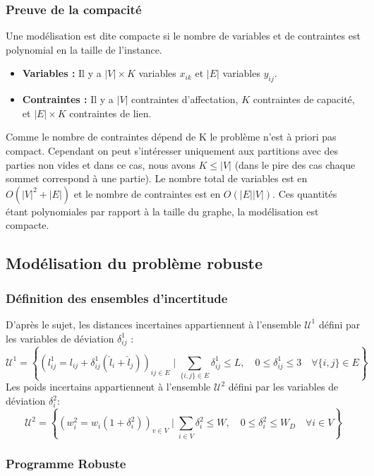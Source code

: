 \documentclass{article}
\begin{document}
\subsubsection*{Preuve de la compacité}

Une modélisation est dite compacte si le nombre de variables et de contraintes est polynomial en la taille de l'instance.
\begin{itemize}
    \item \textbf{Variables :} Il y a $|V| \times K$ variables $x_{ik}$ et $|E|$ variables $y_{ij}$.
    \item \textbf{Contraintes :} Il y a $|V|$ contraintes d'affectation, $K$ contraintes de capacité, et $|E| \times K$ contraintes de lien.
\end{itemize}
Comme le nombre de contraintes dépend de K le problème n'est à priori pas compact.
Cependant on peut s'intéresser uniquement aux partitions avec des parties non vides et dans ce cas, nous avons $K \le |V|$ (dans le pire des cas chaque sommet correspond à une partie). Le nombre total de variables est en $O(|V|^2 + |E|)$ et le nombre de contraintes est en $O(|E||V|)$. Ces quantités étant polynomiales par rapport à la taille du graphe, la modélisation est compacte.

\subsection{Modélisation du problème robuste}

\subsubsection*{Définition des ensembles d'incertitude}

D'après le sujet, les distances incertaines appartiennent à l'ensemble $\mathcal{U}^1$ défini par les variables de déviation $\delta_{ij}^1$ :
\[
\mathcal{U}^1 = \left\{ (l_{ij}^1 = l_{ij} + \delta_{ij}^1 (\hat{l}_i + \hat{l}_j))_{ij\in E} \mid \sum_{\{i,j\} \in E} \delta_{ij}^1 \le L, \quad 0 \le \delta_{ij}^1 \le 3 \quad \forall \{i,j\} \in E \right\}
\]
Les poids incertains appartiennent à l'ensemble $\mathcal{U}^2$ défini par les variables de déviation $\delta_{i}^2$:
\[
\mathcal{U}^2 = \left\{ (w_{i}^2 = w_{i} (1 + \delta_{i}^2))_{v \in V} \mid \sum_{i \in V} \delta_{i}^2 \le W, \quad 0 \le \delta_{i}^2 \le W_D \quad \forall i \in V \right\}
\]

\subsubsection*{Programme Robuste}
\end{document}
